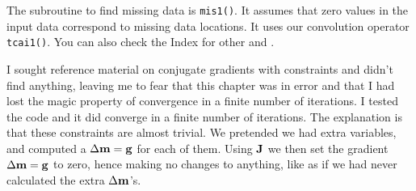 \par
The subroutine to find missing data is \texttt{mis1()}.
It assumes that zero values in the input data
correspond to missing data locations.
It uses our convolution operator
\texttt{tcai1()}.
You can also check the Index for other
 and .
\noindent


\par
I sought reference material on conjugate gradients with constraints
and didn't find anything,
leaving me to fear that this chapter was in error
and that I had lost the magic property of convergence
in a finite number of iterations.
I tested the code and it did converge in a finite number of iterations.
The explanation is that these constraints are almost trivial.
We pretended we had extra variables,
and computed a $\Delta \bold m =\bold g$ for each of them.
Using $\bold J$ we then set the gradient $\Delta \bold m =\bold g$ to zero,
hence making no changes to anything,
like as if we had never calculated the extra  $\Delta \bold m$'s.


